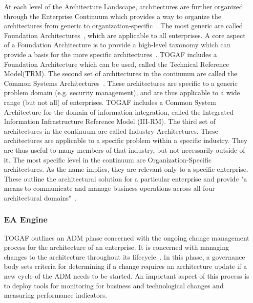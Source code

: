At each level of the Architecture Landscape, architectures are further organized through the Enterprise Continuum which provides a way to organize the architectures from generic to organization-specific~\cite[Ch. 39]{togaf9.1}. The most generic are called Foundation Architectures~\cite[Ch. 39.4.1]{togaf9.1}, which are applicable to all enterprises. A core aspect of a Foundation Architecture is to provide a high-level taxonomy which can provide a basis for the more specific architectures~\cite[Ch. 43]{togaf9.1}. TOGAF includes a Foundation Architecture which can be used, called the Technical Reference Model(TRM). The second set of architectures in the continuum are called the Common Systems Architectures~\cite[Ch. 39.4.1]{togaf9.1}. These architectures are specific to a generic problem domain (e.g. security management), and are thus applicable to a wide range (but not all) of enterprises. TOGAF includes a Common System Architecture for the domain of information integration, called the Integrated Information Infrastructure Reference Model (III-RM). The third set of architectures in the continuum are called Industry Architectures. These architectures are applicable to a specific problem within a specific industry. They are thus useful to many members of that industry, but not necessarily outside of it. The most specific level in the continuum are Organization-Specific  architectures. As the name implies, they are relevant only to a specific enterprise. These outline the architectural solution for a particular enterprise and provide "a means to communicate and manage business operations across all four architectural domains"~\cite[Ch. 39.4.1]{togaf9.1}.





\subsubsection{EA Engine}

TOGAF outlines an ADM phase concerned with the ongoing change management process for the architecture of an enterprise.  It is concerned with managing changes to the architecture throughout its lifecycle~\cite[Ch. 16]{togaf9.1}. In this phase, a governance body sets criteria for determining if a change requires an architecture update if a new cycle of the ADM needs to be started. An important aspect of this process is to deploy tools for monitoring for business and technological changes and measuring performance indicators. 

